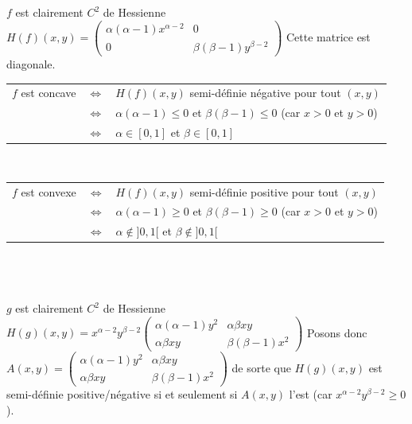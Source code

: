 \documentclass{report}
\begin{document}
\subsection{} \noindent{}\\ 
\\ 
\\
\noindent $f$ est clairement $C^2$ de Hessienne $H(f)(x,y)=\begin{pmatrix}
\alpha(\alpha-1)x^{\alpha-2} & 0 \\
0 & \beta(\beta-1)y^{\beta-2}
\end{pmatrix}$\newline
Cette matrice est diagonale.\newline
\setlength{\tabcolsep}{0.1em}
\begin{tabular}{ccl}
$f$ est concave & $\iff$ & $H(f)(x,y)$ semi-définie négative pour tout $(x,y)$\\
& $\iff $ & $\alpha(\alpha-1)\leq 0$ et $\beta(\beta-1)\leq 0$ \quad (car $x>0$ et $y>0$)\\
& $\iff $ & $\alpha \in [0,1]$ et $\beta \in [0,1]$
\end{tabular}\newline
\\
\begin{tabular}{ccl}
$f$ est convexe & $\iff$ & $H(f)(x,y)$ semi-définie positive pour tout $(x,y)$\\
& $\iff $ & $\alpha(\alpha-1)\geq 0$ et $\beta(\beta-1)\geq 0$ \quad (car $x>0$ et $y>0$)\\
& $\iff $ & $\alpha \notin ]0,1[$ et $\beta \notin ]0,1[$
\end{tabular}\\
\\
\\
\noindent $g$ est clairement $C^2$ de Hessienne $H(g)(x,y)= x^{\alpha-2}y^{\beta-2} \begin{pmatrix}
\alpha (\alpha -1)y^2 & \alpha \beta xy \\
\alpha \beta xy & \beta(\beta -1)x^2
\end{pmatrix}$ \newline
Posons donc $A(x,y) = \begin{pmatrix}
\alpha (\alpha -1)y^2 & \alpha \beta xy \\
\alpha \beta xy & \beta(\beta -1)x^2
\end{pmatrix}$ de sorte que $H(g)(x,y)$ est semi-définie positive/négative si et seulement si $A(x,y)$ l'est (car $x^{\alpha-2}y^{\beta-2}\geq 0$).\newline \newline 
\end{document}
